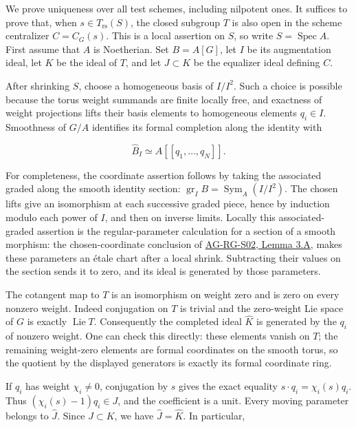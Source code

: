 \documentclass[11pt,a4paper,openany]{report}
\begin{document}
We prove uniqueness over all test schemes, including nilpotent ones. It suffices to prove that, when \(s\in T_{\mathrm{rs}}(S)\), the closed subgroup \(T\) is also open in the scheme centralizer \(C=C_G(s)\). This is a local assertion on \(S\), so write \(S=\operatorname{Spec}A\). First assume that \(A\) is Noetherian. Set \(B=A[G]\), let \(I\) be its augmentation ideal, let \(K\) be the ideal of \(T\), and let \(J\subset K\) be the equalizer ideal defining \(C\).

After shrinking \(S\), choose a homogeneous basis of \(I/I^2\). Such a choice is possible because the torus weight summands are finite locally free, and exactness of weight projections lifts their basis elements to homogeneous elements \(q_i\in I\). Smoothness of \(G/A\) identifies its formal completion along the identity with

\[
\widehat B_I\simeq A[[q_1,\ldots,q_N]].
\]

For completeness, the coordinate assertion follows by taking the associated graded along the smooth identity section: \(\operatorname{gr}_I B=\operatorname{Sym}_A(I/I^2)\). The chosen lifts give an isomorphism at each successive graded piece, hence by induction modulo each power of \(I\), and then on inverse limits. Locally this associated-graded assertion is the regular-parameter calculation for a section of a smooth morphism: the chosen-coordinate conclusion of \href{AG-RG-S02.html\#smooth-map-differential}{AG-RG-S02, Lemma 3.A}, makes these parameters an étale chart after a local shrink. Subtracting their values on the section sends it to zero, and its ideal is generated by those parameters.

The cotangent map to \(T\) is an isomorphism on weight zero and is zero on every nonzero weight. Indeed conjugation on \(T\) is trivial and the zero-weight Lie space of \(G\) is exactly \(\operatorname{Lie}T\). Consequently the completed ideal \(\widehat K\) is generated by the \(q_i\) of nonzero weight. One can check this directly: these elements vanish on \(T\); the remaining weight-zero elements are formal coordinates on the smooth torus, so the quotient by the displayed generators is exactly its formal coordinate ring.

If \(q_i\) has weight \(\chi_i\ne0\), conjugation by \(s\) gives the exact equality \(s\cdot q_i=\chi_i(s)q_i\). Thus \((\chi_i(s)-1)q_i\in J\), and the coefficient is a unit. Every moving parameter belongs to \(\widehat J\). Since \(J\subset K\), we have \(\widehat J=\widehat K\). In particular,
\end{document}
